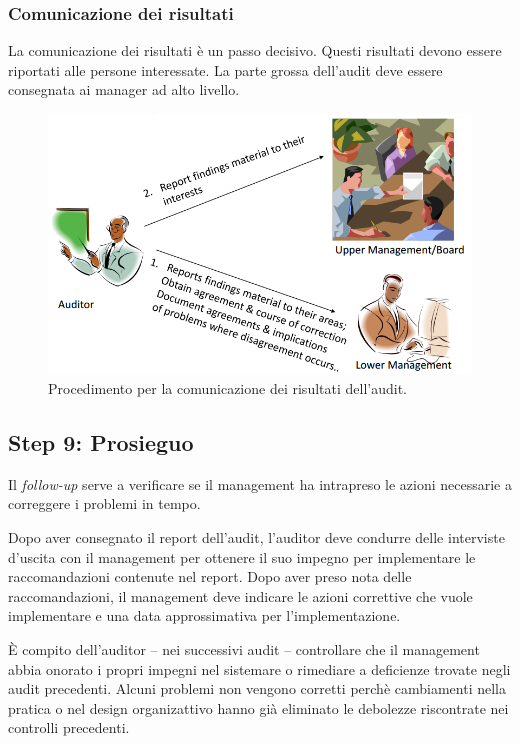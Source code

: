 \subsubsection{Comunicazione dei risultati}

La comunicazione dei risultati è un passo decisivo. Questi risultati devono
essere riportati alle persone interessate.
La parte grossa dell'audit deve essere consegnata ai manager ad alto
livello.

\begin{figure}[h!]
        \begin{center}
                \includegraphics[scale=0.4]{res/img/communication_audit.png}
        \end{center}
        \caption{Procedimento per la comunicazione dei risultati dell'audit.}
\end{figure}

\subsection{Step 9: Prosieguo}


Il \textit{follow-up} serve a verificare se il management ha intrapreso le azioni
necessarie a correggere i problemi in tempo.

Dopo aver consegnato il report dell'audit, l'auditor deve condurre
delle interviste d'uscita con il management per ottenere il suo
impegno per implementare le raccomandazioni contenute nel report.
Dopo aver preso nota delle raccomandazioni, il management deve
indicare le azioni correttive che vuole implementare e una data
approssimativa per l'implementazione.

È compito dell'auditor -- nei successivi audit --
controllare che il management abbia onorato
i propri impegni nel sistemare o rimediare a deficienze trovate negli
audit precedenti.
Alcuni problemi non vengono corretti perchè cambiamenti nella pratica o
nel design organizattivo hanno già eliminato le debolezze riscontrate nei
controlli precedenti.

